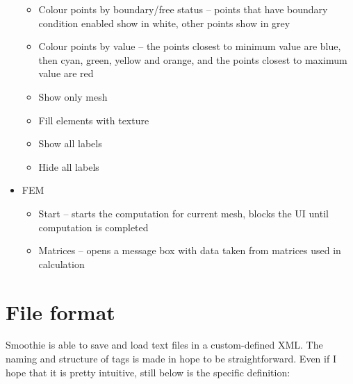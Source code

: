 \documentclass[a4paper,12pt]{article}
\begin{document}
\begin{itemize}
\begin{itemize}
    \item Colour points by boundary/free status -- points that have boundary condition enabled show in white, other
    points show in grey

    \item Colour points by value -- the points closest to minimum value are blue, then cyan, green, yellow and orange,
    and the points closest to maximum value are red

    \item Show only mesh

    \item Fill elements with texture

    \item Show all labels

    \item Hide all labels

  \end{itemize}

  \item FEM

  \begin{itemize}

    \item Start -- starts the computation for current mesh, blocks the UI until computation is completed

    \item Matrices -- opens a message box with data taken from matrices used in calculation  

  \end{itemize}

\end{itemize}

\newpage

\section{File format}

Smoothie is able to save and load text files in a custom-defined XML. The naming and structure of tags is made in hope
to be straightforward. Even if I hope that it is pretty intuitive, still below is the specific definition:
\end{document}
